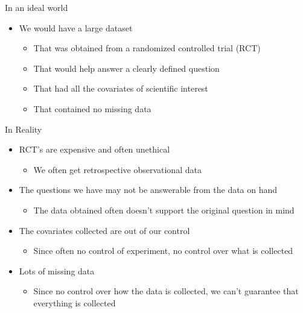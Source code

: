 

\begin{frame}{In an ideal world}
  \begin{itemize}
  \item We would have a large dataset
  \begin{itemize}
   \item That was obtained from a randomized controlled trial (RCT)
   \item That would help answer a clearly defined question
   \item That had all the covariates of scientific interest
   \item That contained no missing data
  \end{itemize}

  \end{itemize}
\end{frame}

\begin{frame}{In Reality}

  \begin{itemize}
   \item RCT's are expensive and often unethical
   \begin{itemize}
    \item We often get retrospective observational data
   \end{itemize}

   \item The questions we have may not be answerable from the data on hand
   \begin{itemize}
    \item The data obtained often doesn't support the original question in mind
   \end{itemize}

   \item The covariates collected are out of our control
   \begin{itemize}
    \item Since often no control of experiment, no control over what is collected
   \end{itemize}

   \item Lots of missing data
   \begin{itemize}
    \item Since no control over how the data is collected, we can't guarantee that everything is collected
   \end{itemize}

  \end{itemize}

\end{frame}

